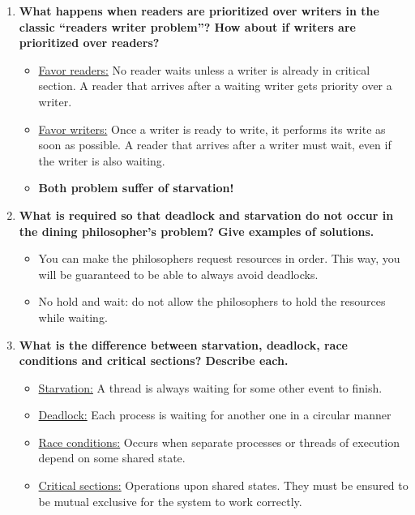\documentclass[a4paper]{article}
\begin{document}
\begin{enumerate}
  \item {\bf  What happens when readers are prioritized over writers in the classic “readers writer problem”?  How about if writers are prioritized over readers?} \\
    \begin{itemize}
      \item \underline{Favor readers:} No reader waits unless a writer is already in critical section. A reader that arrives after a waiting writer gets priority over a writer.
      \item \underline{Favor writers:} Once a writer is ready to write, it performs its write as soon as possible. A reader that arrives after a writer must wait, even if the writer is also waiting.
      \item {\bf Both problem suffer of starvation!}
    \end{itemize}

  \item {\bf  What is required so that deadlock and starvation do not occur in the dining philosopher’s problem?  Give examples of solutions. }\\

    \begin{itemize}
      \item You can make the philosophers request resources in order. This way, you will be guaranteed to be able to always avoid deadlocks.
      \item No hold and wait: do not allow the philosophers to hold the resources while waiting.
    \end{itemize}

  \item {\bf  What is the difference between starvation, deadlock, race conditions and critical sections?  Describe each. } \\
    \begin{itemize}
      \item \underline{Starvation:} A thread is always waiting for some other event to finish.
      \item \underline{Deadlock:} Each process is waiting for another one in a circular manner
      \item \underline{Race conditions:} Occurs when separate processes or threads of execution depend on some shared state.
      \item \underline{Critical sections:} Operations upon shared states. They must be ensured to be mutual exclusive for the system to work correctly.
    \end{itemize}


\end{enumerate}
\end{document}
